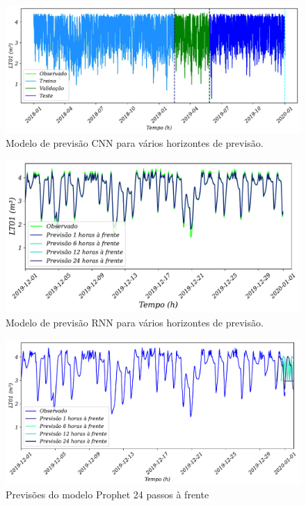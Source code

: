 \begin{figure}[!htb]
	\centering
	\caption{Modelo de previsão CNN para vários horizontes de previsão.}
	\label{fig:1-arma-arima}
	\includegraphics[width=0.7\linewidth]{Resultados/Figuras/CNN}
	
\end{figure}

\begin{figure}[!htb]
	\centering
	\caption{Modelo de previsão RNN para vários horizontes de previsão.}
	\label{fig:rnn}
	\includegraphics[width=0.7\linewidth]{Resultados/Figuras/RNN}
\end{figure}
\begin{figure}[!htb]
	\centering
	\caption{Previsões do modelo Prophet 24 passos à frente}\label{fig:prophet1}
	\includegraphics[width=0.7\linewidth]{Resultados/Figuras/prophet}	
\end{figure}

